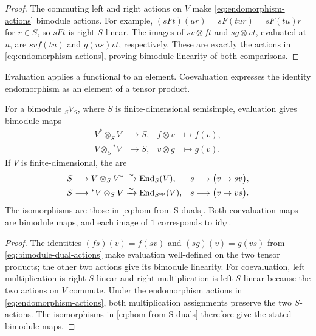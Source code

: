\begin{advanced}
\begin{proof}
The commuting left and right actions on $V$ make \eqref{eq:endomorphism-actions} bimodule actions.
For example, $(sFt)(ur)=sF(tur)=sF(tu)r$ for $r\in S$, so $sFt$ is right $S$-linear.
The images of $sv\otimes ft$ and $sg\otimes vt$, evaluated at $u$, are $svf(tu)$ and $g(us)vt$, respectively.
These are exactly the actions in \eqref{eq:endomorphism-actions}, proving bimodule linearity of both comparisons.
\end{proof}

Evaluation applies a functional to an element.
Coevaluation expresses the identity endomorphism as an element of a tensor product.

\begin{proposition}\label{prop:S-evaluation-coevaluation}
For a bimodule $ {}_SV_S$, where $S$ is finite-dimensional semisimple, evaluation gives bimodule maps
\begin{equation}\label{eq:S-evaluation-pairings}
\begin{aligned}
V^*\otimes_S V&\longrightarrow S,& f\otimes v&\longmapsto f(v),\\
V\otimes_S{}^*V&\longrightarrow S,& v\otimes g&\longmapsto g(v).
\end{aligned}
\end{equation}
If $V$ is finite-dimensional, the  are
\begin{equation}\label{eq:S-coevaluation}
\begin{aligned}
S&\longrightarrow V\otimes_S V^*\xrightarrow{\sim}\operatorname{End}\nolimits_S(V),
& s&\longmapsto\bigl(v\mapsto sv\bigr),\\
S&\longrightarrow{}^*V\otimes_S V\xrightarrow{\sim}\operatorname{End}\nolimits_{S^{\mathrm{op}}}(V),
& s&\longmapsto\bigl(v\mapsto vs\bigr).
\end{aligned}
\end{equation}
The isomorphisms are those in \eqref{eq:hom-from-S-duals}.
Both coevaluation maps are bimodule maps, and each image of $1$ corresponds to $\operatorname{id}_V$.
\end{proposition}

\begin{proof}
The identities $(fs)(v)=f(sv)$ and $(sg)(v)=g(vs)$ from \eqref{eq:bimodule-dual-actions} make evaluation well-defined on the two tensor products; the other two actions give its bimodule linearity.
For coevaluation, left multiplication is right $S$-linear and right multiplication is left $S$-linear because the two actions on $V$ commute.
Under the endomorphism actions in \eqref{eq:endomorphism-actions}, both multiplication assignments preserve the two $S$-actions.
The isomorphisms in \eqref{eq:hom-from-S-duals} therefore give the stated bimodule maps.
\end{proof}


\end{advanced}
